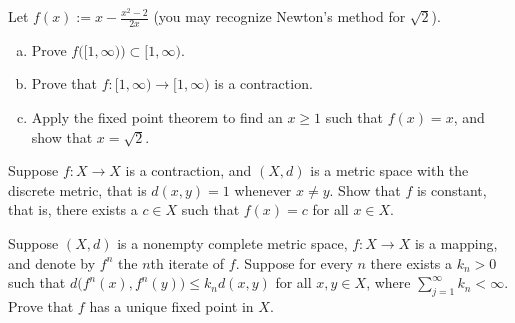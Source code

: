 \begin{exercise}
Let $f(x) := x-\frac{x^2-2}{2x}$ (you may recognize Newton's method for
$\sqrt{2}$).
\begin{enumerate}[a)]
\item
Prove $f\bigl([1,\infty)\bigr) \subset [1,\infty)$.
\item
Prove that $f \colon [1,\infty) \to [1,\infty)$ is a contraction.
\item
Apply the fixed point theorem to find an $x \geq 1$ such that
$f(x) = x$, and show that $x = \sqrt{2}$.
\end{enumerate}
\end{exercise}

\begin{exercise}
Suppose $f \colon X \to X$ is a contraction, and $(X,d)$ is a metric space
with the discrete metric, that is $d(x,y) = 1$ whenever $x \not= y$.
Show that $f$ is constant, that is,
there exists a $c \in X$ such that $f(x) = c$ for all $x \in X$.
\end{exercise}

\begin{exercise}
Suppose $(X,d)$ is a nonempty complete metric space,
$f \colon X \to X$ is a mapping, and denote
by $f^n$ the $n$th iterate of $f$.  Suppose
for every $n$ there exists a $k_n > 0$ such that
$d\bigl(f^n(x),f^n(y)\bigr) \leq k_n d(x,y)$
for all $x,y \in X$,
where $\sum_{j=1}^\infty k_n < \infty$.
Prove that $f$ has a unique fixed point in $X$.
\end{exercise}
